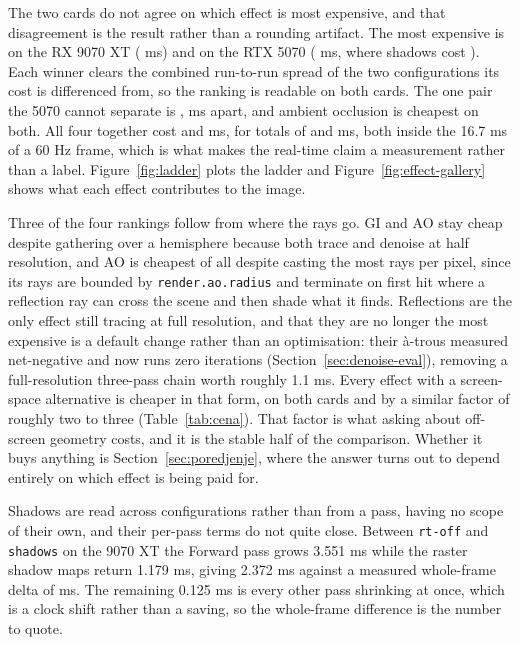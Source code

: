 The two cards do not agree on which effect is most expensive, and that disagreement is the result
rather than a rounding artifact. The most expensive is \perfTopEffectAMD{} on the RX 9070 XT
(\perfEffShadowsAMD{} ms) and \perfTopEffectNV{} on the RTX 5070 (\perfEffGiNV{} ms, where shadows
cost \perfEffShadowsNV{}). Each winner clears the combined run-to-run spread of the two
configurations its cost is differenced from, so the ranking is readable on both cards. The one pair
the 5070 cannot separate is \perfUnresolvedNV{}, \perfUnresolvedGapNV{} ms apart, and ambient
occlusion is cheapest on both. All four together cost \perfFourEffectsAMD{} and
\perfFourEffectsNV{} ms, for totals of \perfTotalAMD{} and \perfTotalNV{} ms, both inside the
16.7 ms of a 60 Hz frame, which is what makes the real-time claim a measurement rather than a label.
Figure~\ref{fig:ladder} plots the ladder and Figure~\ref{fig:effect-gallery} shows what each effect
contributes to the image.

Three of the four rankings follow from where the rays go. GI and AO stay cheap despite gathering over
a hemisphere because both trace and denoise at half resolution, and AO is cheapest of all despite
casting the most rays per pixel, since its rays are bounded by \texttt{render.ao.radius} and
terminate on first hit where a reflection ray can cross the scene and then shade what it finds.
Reflections are the only effect still tracing at full resolution, and that they are no longer the
most expensive is a default change rather than an optimisation: their à-trous measured net-negative
and now runs zero iterations (Section~\ref{sec:denoise-eval}), removing a full-resolution three-pass
chain worth roughly 1.1 ms. Every effect with a screen-space alternative is cheaper in that form, on
both cards and by a similar factor of roughly two to three (Table~\ref{tab:cena}). That factor is
what asking about off-screen geometry costs, and it is the stable half of the comparison. Whether it
buys anything is Section~\ref{sec:poredjenje}, where the answer turns out to depend entirely on which
effect is being paid for.

Shadows are read across configurations rather than from a pass, having no scope of their own, and
their per-pass terms do not quite close. Between \texttt{rt-off} and \texttt{shadows} on the 9070 XT
the Forward pass grows 3.551 ms while the raster shadow maps return 1.179 ms, giving 2.372 ms against
a measured whole-frame delta of \perfEffShadowsAMD{} ms. The remaining 0.125 ms is every other pass
shrinking at once, which is a clock shift rather than a saving, so the whole-frame difference is the
number to quote.

